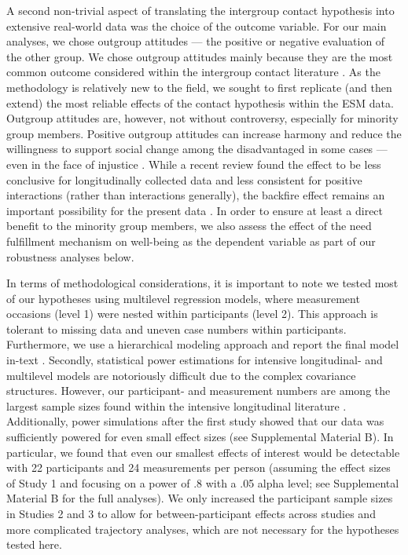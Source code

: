 \documentclass[man, 12pt, a4paper, mask]{apa7}
\theoremstyle{break}
\theoremstyle{plain}
\begin{document}
A second non-trivial aspect of translating the intergroup contact hypothesis into extensive real-world data was the choice of the outcome variable. For our main analyses, we chose outgroup attitudes --- the positive or negative evaluation of the other group. We chose outgroup attitudes mainly because they are the most common outcome considered within the intergroup contact literature \citep[e.g.,][]{Pettigrew2006, Paolini2021}. As the methodology is relatively new to the field, we sought to first replicate (and then extend) the most reliable effects of the contact hypothesis within the ESM data. Outgroup attitudes are, however, not without controversy, especially for minority group members. Positive outgroup attitudes can increase harmony and reduce the willingness to support social change among the disadvantaged in some cases --- even in the face of injustice \citep[e.g.,][]{dixon2012, saguy2009}. While a recent review found the effect to be less conclusive for longitudinally collected data and less consistent for positive interactions (rather than interactions generally), the backfire effect remains an important possibility for the present data \citep[see][]{reimer2023}. In order to ensure at least a direct benefit to the minority group members, we also assess the effect of the need fulfillment mechanism on well-being as the dependent variable as part of our robustness analyses below.

In terms of methodological considerations, it is important to note we tested most of our hypotheses using multilevel regression models, where measurement occasions (level 1) were nested within participants (level 2). This approach is tolerant to missing data and uneven case numbers within participants. Furthermore, we use a hierarchical modeling approach and report the final model in-text \citep[][; for the full modeling process see Supplementary Material A]{snijders2012}. Secondly, statistical power estimations for intensive longitudinal- and multilevel models are notoriously difficult due to the complex covariance structures. However, our participant- and measurement numbers are among the largest sample sizes found within the intensive longitudinal literature \citep[e.g.,][]{AanhetRot2012}. Additionally, power simulations after the first study showed that our data was sufficiently powered for even small effect sizes (see Supplemental Material B). In particular, we found that even our smallest effects of interest would be detectable with 22 participants and 24 measurements per person (assuming the effect sizes of Study 1 and focusing on a power of .8 with a .05 alpha level; see Supplemental Material B for the full analyses). We only increased the participant sample sizes in Studies 2 and 3 to allow for between-participant effects across studies and more complicated trajectory analyses, which are not necessary for the hypotheses tested here.
\end{document}
